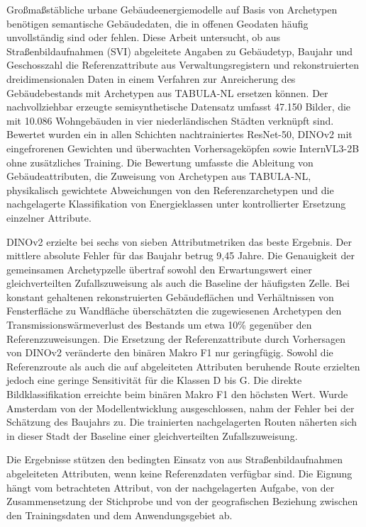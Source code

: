 Großmaßstäbliche urbane Gebäudeenergiemodelle auf Basis von Archetypen benötigen semantische Gebäudedaten, die in offenen Geodaten häufig unvollständig sind oder fehlen. Diese Arbeit untersucht, ob aus Straßenbildaufnahmen (SVI) abgeleitete Angaben zu Gebäudetyp, Baujahr und Geschosszahl die Referenzattribute aus Verwaltungsregistern und rekonstruierten dreidimensionalen Daten in einem Verfahren zur Anreicherung des Gebäudebestands mit Archetypen aus TABULA-NL ersetzen können. Der nachvollziehbar erzeugte semisynthetische Datensatz umfasst 47.150 Bilder, die mit 10.086 Wohngebäuden in vier niederländischen Städten verknüpft sind. Bewertet wurden ein in allen Schichten nachtrainiertes ResNet-50, DINOv2 mit eingefrorenen Gewichten und überwachten Vorhersageköpfen sowie InternVL3-2B ohne zusätzliches Training. Die Bewertung umfasste die Ableitung von Gebäudeattributen, die Zuweisung von Archetypen aus TABULA-NL, physikalisch gewichtete Abweichungen von den Referenzarchetypen und die nachgelagerte Klassifikation von Energieklassen unter kontrollierter Ersetzung einzelner Attribute.

DINOv2 erzielte bei sechs von sieben Attributmetriken das beste Ergebnis. Der mittlere absolute Fehler für das Baujahr betrug 9,45 Jahre. Die Genauigkeit der gemeinsamen Archetypzelle übertraf sowohl den Erwartungswert einer gleichverteilten Zufallszuweisung als auch die Baseline der häufigsten Zelle. Bei konstant gehaltenen rekonstruierten Gebäudeflächen und Verhältnissen von Fensterfläche zu Wandfläche überschätzten die zugewiesenen Archetypen den Transmissionswärmeverlust des Bestands um etwa 10\% gegenüber den Referenzzuweisungen. Die Ersetzung der Referenzattribute durch Vorhersagen von DINOv2 veränderte den binären Makro F1 nur geringfügig. Sowohl die Referenzroute als auch die auf abgeleiteten Attributen beruhende Route erzielten jedoch eine geringe Sensitivität für die Klassen D bis G. Die direkte Bildklassifikation erreichte beim binären Makro F1 den höchsten Wert. Wurde Amsterdam von der Modellentwicklung ausgeschlossen, nahm der Fehler bei der Schätzung des Baujahrs zu. Die trainierten nachgelagerten Routen näherten sich in dieser Stadt der Baseline einer gleichverteilten Zufallszuweisung.

Die Ergebnisse stützen den bedingten Einsatz von aus Straßenbildaufnahmen abgeleiteten Attributen, wenn keine Referenzdaten verfügbar sind. Die Eignung hängt vom betrachteten Attribut, von der nachgelagerten Aufgabe, von der Zusammensetzung der Stichprobe und von der geografischen Beziehung zwischen den Trainingsdaten und dem Anwendungsgebiet ab.
